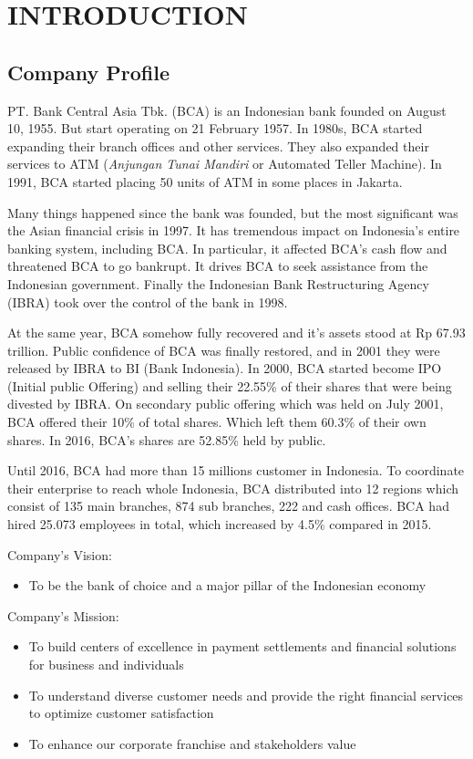 \chapter{INTRODUCTION}
\section{Company Profile}
PT. Bank Central Asia Tbk. (BCA) is an Indonesian bank founded on August 10, 1955. But start operating on 21 February 1957. In 1980s, BCA started expanding their branch offices and other services. They also expanded their services to ATM (\textit{Anjungan Tunai Mandiri} or Automated Teller Machine). In 1991, BCA started placing 50 units of ATM in some places in Jakarta.

Many things happened since the bank was founded, but the most significant was the Asian financial crisis in 1997. It has tremendous impact on Indonesia's entire banking system, including BCA. In particular, it affected BCA's cash flow and threatened BCA to go bankrupt. It drives BCA to seek assistance from the Indonesian government. Finally the Indonesian Bank Restructuring Agency (IBRA) took over the control of the bank in 1998.

At the same year, BCA somehow fully recovered and it's assets stood at Rp 67.93 trillion. Public confidence of BCA was finally restored, and in 2001 they were released by IBRA to BI (Bank Indonesia). In 2000, BCA started become IPO (Initial public Offering) and selling their 22.55\% of their shares that were being divested by IBRA. On secondary public offering which was held on July 2001, BCA offered their 10\% of total shares. Which left them 60.3\% of their own shares. In 2016, BCA's shares are 52.85\% held by public.

Until 2016, BCA had more than 15 millions customer in Indonesia. To coordinate their enterprise to reach whole Indonesia, BCA distributed into 12 regions which consist of 135 main branches, 874 sub branches, 222 and cash offices. BCA had hired 25.073 employees in total, which increased by 4.5\% compared in 2015.

Company's Vision:
\begin{itemize}
	\itemsep0em
    \item To be the bank of choice and a major pillar of the Indonesian economy
\end{itemize}

Company's Mission:
\begin{itemize}
	\itemsep0em
    \item To build centers of excellence in payment settlements and financial solutions for business and individuals
    \item To understand diverse customer needs and provide the right financial services to optimize customer satisfaction
    \item To enhance our corporate franchise and stakeholders value
\end{itemize}


